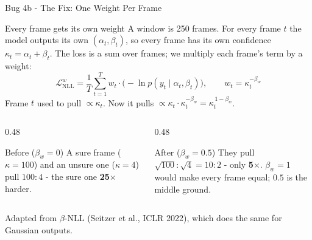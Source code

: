 \documentclass[aspectratio=169]{beamer}
\newcommand{\hl}[1]{\textcolor{coolpurple}{\textbf{#1}}}
\begin{document}
	\begin{frame}{Bug 4b - The Fix: One Weight Per Frame}
		\begin{block}{Every frame gets its own weight}
			\small
			A window is 250 frames. For every frame $t$ the model outputs its own
			$(\alpha_t, \beta_t)$, so every frame has its own confidence
			$\kappa_t = \alpha_t + \beta_t$. The loss is a sum over frames; we multiply each
			frame's term by a weight:
			$$ \mathcal{L}^{w}_{\text{NLL}} = \frac{1}{T}\sum_{t=1}^{T} w_t \cdot \bigl(-\ln p(y_t \mid \alpha_t, \beta_t)\bigr),
			\qquad w_t = \kappa_t^{-\beta_w} $$
			Frame $t$ used to pull $\propto \kappa_t$. Now it pulls
			$\propto \kappa_t \cdot \kappa_t^{-\beta_w} = \kappa_t^{\,1-\beta_w}$.
		\end{block}
		\begin{columns}[onlytextwidth]
			\begin{column}{0.48\textwidth}
				\begin{alertblock}{Before ($\beta_w = 0$)}
					\small
					A sure frame ($\kappa = 100$) and an unsure one ($\kappa = 4$) pull
					$100 : 4$ - the sure one \textbf{25$\times$} harder.
				\end{alertblock}
			\end{column}
			\begin{column}{0.48\textwidth}
				\begin{block}{After ($\beta_w = 0.5$)}
					\small
					They pull $\sqrt{100} : \sqrt{4} = 10 : 2$ - only \hl{5$\times$}.
					$\beta_w = 1$ would make every frame equal; $0.5$ is the middle ground.
				\end{block}
			\end{column}
		\end{columns}
		\vspace{0.1em}
		\centering\footnotesize
		Adapted from $\beta$-NLL (Seitzer et al., ICLR 2022), which does the same for Gaussian outputs.
	\end{frame}
\end{document}
